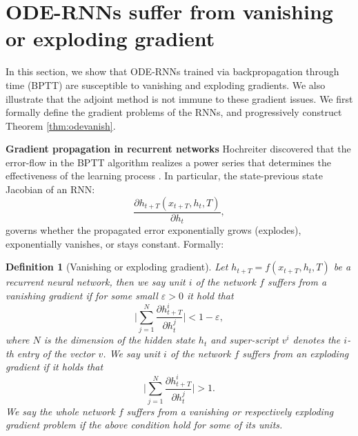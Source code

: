 \documentclass{article}
\newtheorem{definition}{Definition}
\begin{document}
\section{ODE-RNNs suffer from vanishing or exploding gradient}
In this section, we show that ODE-RNNs trained via backpropagation through time (BPTT) are susceptible to vanishing and exploding gradients. We also illustrate that the adjoint method is not immune to these gradient issues. We first formally define the gradient problems of the RNNs, and progressively construct Theorem \ref{thm:odevanish}.


\textbf{Gradient propagation in recurrent networks   }
Hochreiter \cite{hochreiter1991untersuchungen} discovered that the error-flow in the BPTT algorithm realizes a power series that determines the effectiveness of the learning process \cite{hochreiter1991untersuchungen,hochreiter1997long,bengio1994learning,pascanu2013difficulty}.
In particular, the state-previous state Jacobian of an RNN:
\begin{equation}\label{eq:jac}
    \frac{\partial {h_{t+T}(x_{t+T},h_t,T)}}{\partial h_t},
\end{equation}
governs whether the propagated error exponentially grows (explodes), exponentially vanishes, or stays constant. Formally:





\begin{definition}[Vanishing or exploding gradient]
    Let $h_{t+T} = f(x_{t+T},h_t,T)$ be a recurrent neural network, then we say unit $i$ of the network $f$ suffers from a vanishing gradient if for some small $\varepsilon>0$ it hold that
    \begin{equation}\label{eq:vanish}
    \Big| \sum_{j=1}^{N} \frac{\partial h^i_{t+T}}{\partial h^j_t}\Big| < 1-\varepsilon,
    \end{equation}
    where $N$ is the dimension of the hidden state $h_t$ and super-script $v^i$ denotes the $i$-th entry of the vector $v$.
    We say unit $i$ of the network $f$ suffers from an exploding gradient if it holds that
    \begin{equation}
    \Big| \sum_{j=1}^{N} \frac{\partial h^i_{t+T}}{\partial h^j_t}\Big| > 1.
    \end{equation}
    We say the whole network $f$ suffers from a vanishing or respectively exploding gradient problem if the above condition hold for some of its units.
\end{definition}
\end{document}
